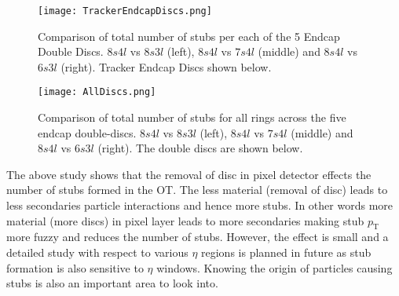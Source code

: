 \begin{figure}[H]
    \centering
\texttt{[image: TrackerEndcapDiscs.png]}
  \caption{Comparison of total number of stubs per each of the 5 Endcap Double Discs. $8s4l$ vs $8s3l$ (left), $8s4l$ vs $7s4l$ (middle) and $8s4l$ vs $6s3l$ (right). Tracker Endcap Discs shown below.}\label{stubsEndcap}
\end{figure}

\begin{figure}[H]
    \centering
\texttt{[image: AllDiscs.png]}
  \caption{Comparison of total number of stubs for all rings across the five endcap double-discs. $8s4l$ vs $8s3l$ (left), $8s4l$ vs $7s4l$ (middle) and $8s4l$ vs $6s3l$ (right). The double discs are shown below.}
  \label{stubsPerRing}
\end{figure}

\vspace{1em}

The  above study shows that the removal of disc in pixel detector effects the number of stubs formed in the OT. The less material (removal of disc) leads to less secondaries particle interactions and hence more stubs. In other words more material (more discs) in pixel layer leads to more secondaries making stub $p_\text{T}$ more fuzzy and reduces the number of stubs. However, the effect is small and a detailed study with respect to various $\eta$ regions is planned in future as stub formation is also sensitive to $\eta$ windows. Knowing the origin of particles causing stubs is also an important area to look into.

